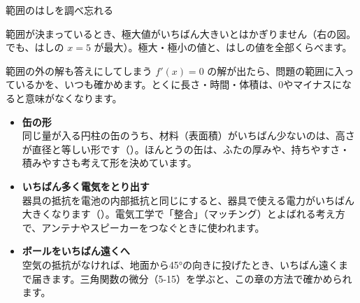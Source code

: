 \begin{tsumazuki}{範囲のはしを調べ忘れる}
\noindent\begin{minipage}[c]{0.62\linewidth}\raggedright
範囲が決まっているとき、極大値がいちばん大きいとはかぎりません（右の図。でも、はしの $x=5$ が最大）。極大・極小の値と、はしの値を全部くらべます。
\end{minipage}\hfill
\begin{minipage}[c]{0.34\linewidth}\centering
{}
\end{minipage}
\end{tsumazuki}

\begin{tsumazuki}{範囲の外の解も答えにしてしまう}
$f'(x)=0$ の解が出たら、問題の範囲に入っているかを、いつも確かめます。とくに長さ・時間・体積は、0やマイナスになると意味がなくなります。
\end{tsumazuki}

\begin{butsuri}
\begin{itemize}[leftmargin=1.2\zw, itemsep=2pt, topsep=0pt, label={\color{bkPurple}●}]
\item \textbf{缶の形}\\
同じ量が入る円柱の缶のうち、材料（表面積）がいちばん少ないのは、高さが直径と等しい形です（）。ほんとうの缶は、ふたの厚みや、持ちやすさ・積みやすさも考えて形を決めています。
\item \textbf{いちばん多く電気をとり出す}\\
器具の抵抗を電池の内部抵抗と同じにすると、器具で使える電力がいちばん大きくなります（）。電気工学で「整合」（マッチング）とよばれる考え方で、アンテナやスピーカーをつなぐときに使われます。
\item \textbf{ボールをいちばん遠くへ}\\
空気の抵抗がなければ、地面から45°の向きに投げたとき、いちばん遠くまで届きます。三角関数の微分（5-15）を学ぶと、この章の方法で確かめられます。
\end{itemize}
\end{butsuri}

